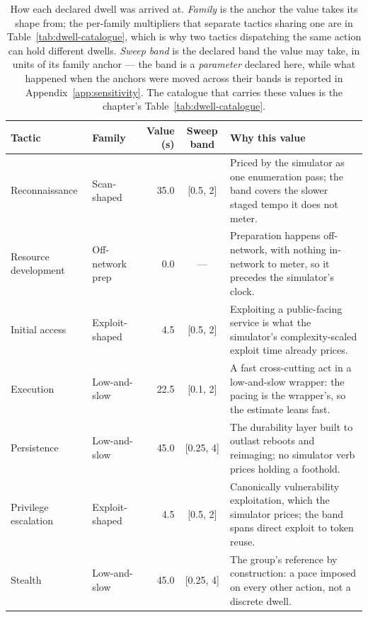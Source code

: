
\begin{table}[htbp]
\centering
\scriptsize
\setlength{\tabcolsep}{4pt}
\caption[Derivation of the declared dwell times]{How each declared dwell was arrived at. \emph{Family} is the anchor the value takes its shape from; the per-family multipliers that separate tactics sharing one are in Table~\ref{tab:dwell-catalogue}, which is why two tactics dispatching the same action can hold different dwells. \emph{Sweep band} is the declared band the value may take, in units of its family anchor --- the band is a \emph{parameter} declared here, while what happened when the anchors were moved across their bands is reported in Appendix~\ref{app:sensitivity}. The catalogue that carries these values is the chapter's Table~\ref{tab:dwell-catalogue}.}
\label{tab:dwell-derivation}
\begin{tabular}{@{}l l r c p{}@{}}
\toprule
Tactic & Family & Value (s) & Sweep band & Why this value \\
\midrule
Reconnaissance & Scan-shaped & 35.0 & [0.5, 2] & Priced by the simulator as one enumeration pass; the band covers the slower staged tempo it does not meter. \\
Resource development & Off-network prep & 0.0 & --- & Preparation happens off-network, with nothing in-network to meter, so it precedes the simulator's clock. \\
Initial access & Exploit-shaped & 4.5 & [0.5, 2] & Exploiting a public-facing service is what the simulator's complexity-scaled exploit time already prices. \\
Execution & Low-and-slow & 22.5 & [0.1, 2] & A fast cross-cutting act in a low-and-slow wrapper: the pacing is the wrapper's, so the estimate leans fast. \\
Persistence & Low-and-slow & 45.0 & [0.25, 4] & The durability layer built to outlast reboots and reimaging; no simulator verb prices holding a foothold. \\
Privilege escalation & Exploit-shaped & 4.5 & [0.5, 2] & Canonically vulnerability exploitation, which the simulator prices; the band spans direct exploit to token reuse. \\
Stealth & Low-and-slow & 45.0 & [0.25, 4] & The group's reference by construction: a pace imposed on every other action, not a discrete dwell. \\

\end{tabular}
\end{table}
